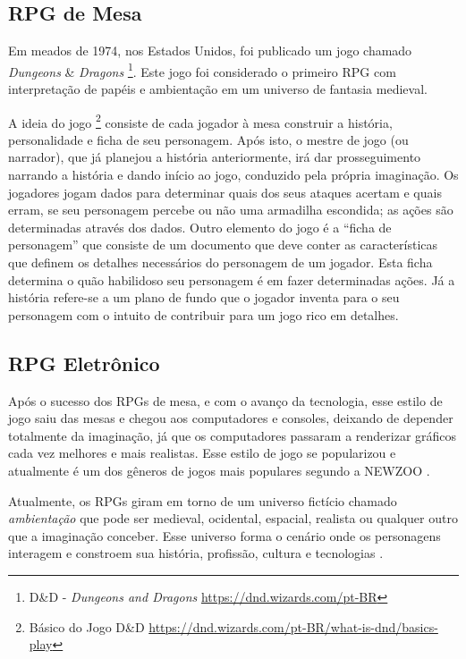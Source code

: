 \subsection{RPG de Mesa}
\label{sec:rpg-de-mesa}
Em meados de 1974, nos Estados Unidos, foi publicado um jogo chamado \textit{Dungeons} \& \textit{Dragons} \footnote{D\&D - \textit{Dungeons and Dragons} \url{https://dnd.wizards.com/pt-BR}}. Este jogo foi considerado o primeiro RPG com interpretação de papéis e ambientação em um universo de fantasia medieval.

A ideia do jogo \footnote{Básico do Jogo D\&D \url{https://dnd.wizards.com/pt-BR/what-is-dnd/basics-play}} consiste de cada jogador à mesa construir a história, personalidade e ficha de seu personagem. Após isto, o mestre de jogo (ou narrador), que já planejou a história anteriormente, irá dar prosseguimento narrando a história e dando início ao jogo, conduzido pela própria imaginação. Os jogadores jogam dados para determinar quais dos seus ataques acertam e quais erram, se seu personagem percebe ou não uma armadilha escondida; as ações são determinadas através dos dados. Outro elemento do jogo é a ``ficha de personagem'' que consiste de um documento que deve conter as características que definem os detalhes necessários do personagem de um jogador. Esta ficha determina o quão habilidoso seu personagem é em fazer determinadas ações. Já a história refere-se a um plano de fundo que o jogador inventa para o seu personagem com o intuito de contribuir para um jogo rico em detalhes. 

\subsection{RPG Eletrônico}
\label{sec:rpg-eletronico}
Após o sucesso dos RPGs de mesa, e com o avanço da tecnologia, esse estilo de jogo saiu das mesas e chegou aos computadores e consoles, deixando de depender totalmente da imaginação, já que os computadores passaram a renderizar gráficos cada vez melhores e mais realistas. Esse estilo de jogo se popularizou e atualmente é um dos gêneros de jogos mais populares segundo a NEWZOO \cite{NEWZOO}.

Atualmente, os RPGs giram em torno de um universo fictício chamado \textit{ambientação} que pode ser medieval, ocidental, espacial, realista ou qualquer outro que a imaginação conceber. Esse universo forma o cenário onde os personagens interagem e constroem sua história, profissão, cultura e tecnologias \cite{duflo1999jogo}.


